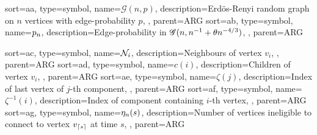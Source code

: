 
\usepackage{setspace}
\usepackage[nopostdot, nonumberlist, toc, style = super, order=letter]{glossaries}



\makeglossaries 







{
	sort={aa},
	type=symbol,
	name={$\mathscr{G}(n,p)$},
	description={Erd\"os-Renyi random graph on $n$ vertices with edge-probability $p$, \pageref{I: gnt}},
	parent=ARG
}
{
	sort={ab},
	type=symbol,
	name={$p_n$},
	description={Edge-probability in $\mathscr{G}(n, n^{-1} + \theta n^{-4/3})$, \pageref{I: pp}},
	parent=ARG
}

{
	sort={ac},
	type=symbol,
	name={$\mathcal{N}_{i}$},
	description={Neighbours of vertex $v_i$, \pageref{D: Ni}},
	parent=ARG
}
{
	sort={ad},
	type=symbol,
	name={$c(i)$},
	description={Children of vertex $v_i$, \pageref{D: ci}},
	parent=ARG
}
{
	sort={ae},
	type=symbol,
	name={$\zeta(j)$},
	description={Index of last vertex of $j$-th component, \pageref{E: zeta}},
	parent=ARG
}
{
	sort={af},
	type=symbol,
	name={$\zeta^{-1}(i)$},
	description={Index of component containing $i$-th vertex, \pageref{E: zeta}},
	parent=ARG
}
{
	sort={ag},
	type=symbol,
	name={$\eta_n(s)$},
	description={Number of vertices ineligible to connect to vertex $v_{\lceil s\rceil}$ at time $s$, \pageref{I: eta}},
	parent=ARG
}



